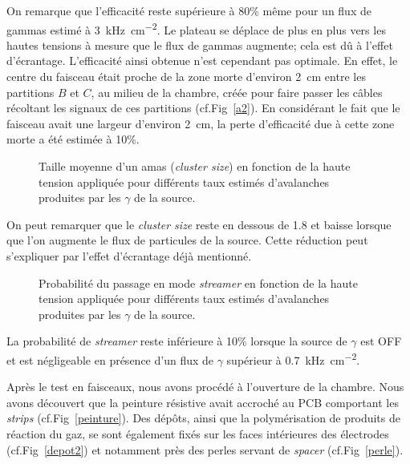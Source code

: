 On remarque que l'efficacité reste supérieure à 80\% même pour un flux de gammas estimé à \SI{3}{\kilo\hertz\per\square\centi\meter}. Le plateau se déplace de plus en plus vers les hautes tensions à mesure que le flux de gammas augmente; cela est dû à l'effet d'écrantage. L'efficacité ainsi obtenue n'est cependant pas optimale. En effet, le centre du faisceau était proche de la zone morte d'environ \SI{2}{\centi\meter} entre les partitions $B$ et $C$, au milieu de la chambre, créée pour faire passer les câbles récoltant les signaux de ces partitions (cf.Fig~\ref{a2}). En considérant le fait que le faisceau avait une largeur d'environ \SI{2}{\centi\meter}, la perte d'efficacité due à cette zone morte a été estimée à \num{10}\%.

\begin{figure}[!ht]
	\centering
	\caption{Taille moyenne d'un amas (\textit{cluster size}) en fonction de la haute tension appliquée pour différents taux estimés d'avalanches produites par les $\gamma$ de la source.}
	\label{clustersize}
\end{figure}

On peut remarquer que le \textit{cluster size} reste en dessous de \num{1.8} et baisse lorsque que l'on augmente le flux de particules de la source. Cette réduction peut s'expliquer par l'effet d'écrantage déjà mentionné.

\begin{figure}[!ht]
	\centering
	\caption{Probabilité du passage en mode \textit{streamer} en fonction de la haute tension appliquée pour différents taux estimés d'avalanches produites par les $\gamma$ de la source.}
	\label{probastreamer}
\end{figure}

La probabilité de \textit{streamer} reste inférieure à 10\% lorsque la source de $\gamma$ est OFF et est négligeable en présence d'un flux de $\gamma$ supérieur à \SI{0.7}{\kilo\hertz\per\square\centi\meter}.

Après le test en faisceaux, nous avons procédé à l'ouverture de la chambre. Nous avons découvert que la peinture résistive avait accroché au PCB comportant les \textit{strips} (cf.Fig~\ref{peinture}). Des dépôts, ainsi que la polymérisation de produits de réaction du gaz, se sont également fixés sur les faces intérieures des électrodes (cf.Fig~\ref{depot2}) et notamment près des perles servant de \textit{spacer} (cf.Fig~\ref{perle}). 

